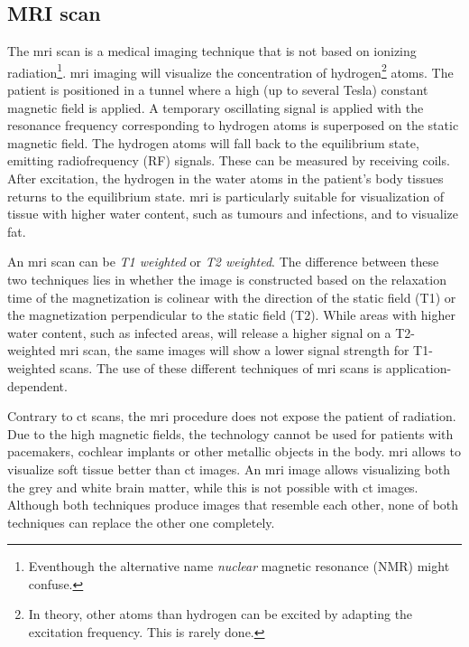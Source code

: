 \subsection{MRI scan}
\par{
    The \acrfull{mri} scan is a medical imaging technique that is not based on ionizing radiation\footnote{Eventhough the alternative name \textit{nuclear} magnetic resonance (NMR) might confuse.}.
    \acrshort{mri} imaging will visualize the concentration of hydrogen\footnote{In theory, other atoms than hydrogen can be excited by adapting the excitation frequency. This is rarely done.} atoms.
    The patient is positioned in a tunnel where a high (up to several Tesla) constant magnetic field is applied. A temporary oscillating signal is applied with the resonance frequency corresponding to hydrogen atoms is superposed on the static magnetic field.
    The hydrogen atoms will fall back to the equilibrium state, emitting radiofrequency (RF) signals. These can be measured by receiving coils.
    After excitation, the hydrogen in the water atoms in the patient's body tissues returns to the equilibrium state. \acrlong{mri} is particularly suitable for visualization of tissue with higher water content, such as tumours and infections, and to visualize fat.
}
\par{
    An \acrshort{mri} scan can be \textit{T1 weighted} or \textit{T2 weighted}. 
    The difference between these two techniques lies in whether the image is constructed based on the relaxation time of the magnetization is colinear with the direction of the static field (T1) or the magnetization perpendicular to the static field (T2).
    While areas with higher water content, such as infected areas, will release a higher signal on a T2-weighted \acrshort{mri} scan, the same images will show a lower signal strength for T1-weighted scans.
    The use of these different techniques of \acrshort{mri} scans is application-dependent.  
}
\par{
    Contrary to \acrfull{ct} scans, the \acrlong{mri} procedure does not expose the patient of radiation. Due to the high magnetic fields, the technology cannot be used for patients with pacemakers, cochlear implants or other metallic objects in the body.
    \acrshort{mri} allows to visualize soft tissue better than \acrshort{ct} images. An \acrshort{mri} image allows visualizing both the grey and white brain matter, while this is not possible with \acrshort{ct} images.
    Although both techniques produce images that resemble each other, none of both techniques can replace the other one completely.
}

